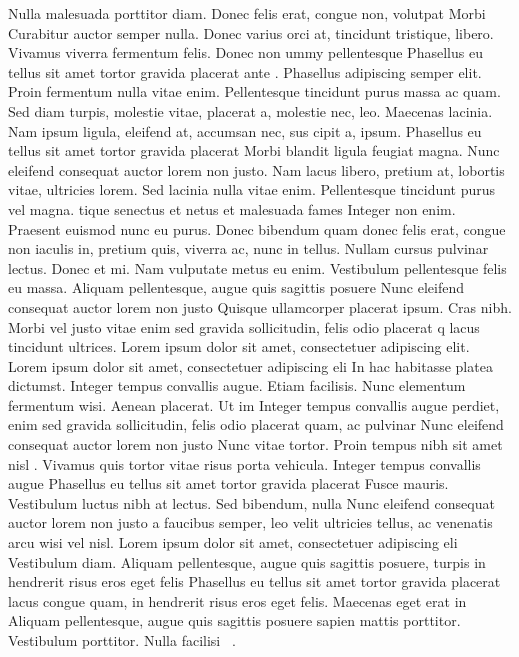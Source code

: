 \documentclass[11pt,a4paper]{article}
\begin{document}
Nulla malesuada porttitor diam. Donec felis erat, congue non, volutpat  Morbi Curabitur auctor semper nulla. Donec varius orci 
at, tincidunt tristique, libero. Vivamus viverra fermentum felis. Donec non ummy pellentesque  Phasellus eu tellus sit amet tortor gravida placerat
ante \cite{LHCB-PAPER-2017-013,Eur.Phys.J.C80(2020)7.641}. Phasellus adipiscing semper elit. Proin fermentum  nulla vitae enim. Pellentesque tincidunt purus
massa ac quam. Sed diam turpis, molestie vitae, placerat a, molestie nec,
leo. Maecenas lacinia. Nam ipsum ligula, eleifend at, accumsan nec, sus cipit a, ipsum.  Phasellus eu tellus sit amet tortor gravida placerat
Morbi blandit ligula feugiat magna. Nunc eleifend consequat auctor lorem non justo. Nam lacus libero, pretium at, lobortis vitae, ultricies
lorem. Sed lacinia nulla vitae enim. Pellentesque tincidunt purus vel magna. tique senectus et netus et malesuada fames 
Integer non enim. Praesent euismod nunc eu purus. Donec bibendum quam donec felis erat, congue non  iaculis in, pretium quis, viverra ac, nunc
in tellus\cite{Coleppa:2017rgb,ChavezFrias:666sob,ATLAS-CONF-2021-025}. Nullam cursus pulvinar lectus. Donec et mi. Nam vulputate metus
eu enim. Vestibulum pellentesque felis eu massa. Aliquam pellentesque, augue quis sagittis posuere Nunc eleifend consequat auctor lorem non justo
Quisque ullamcorper placerat ipsum. Cras nibh. Morbi vel justo vitae  enim sed gravida sollicitudin, felis odio placerat q
lacus tincidunt ultrices. Lorem ipsum dolor sit amet, consectetuer adipiscing elit. \\

Lorem ipsum dolor sit amet, consectetuer adipiscing eli In hac habitasse platea dictumst. Integer tempus convallis augue. 
Etiam facilisis. Nunc elementum fermentum wisi. Aenean placerat. Ut im  Integer tempus convallis augue
perdiet, enim sed gravida sollicitudin, felis odio placerat quam, ac pulvinar Nunc eleifend consequat auctor lorem non justo
\cite{hep-ph/9501339, Ellis:2013yxa,1407.5089, Boudjema:2015nda,1507.07926,1603.03632,Gritsan:2016hjl, Li:2017dyz, AmorDosSantos:2017ayi, 1804.05874} 
Nunc vitae tortor. Proin tempus nibh sit amet nisl \cite{hep-ph/9605326,BhupalDev:2007ftb}. 
Vivamus quis tortor vitae risus porta vehicula.  Integer tempus convallis augue Phasellus eu tellus sit amet tortor gravida placerat
Fusce mauris. Vestibulum luctus nibh at lectus. Sed bibendum, nulla Nunc eleifend consequat auctor lorem non justo
a faucibus semper, leo \cite{FERMILAB-PUB-15-107-T} velit ultricies tellus, ac venenatis arcu wisi vel nisl. Lorem ipsum dolor sit amet, consectetuer adipiscing eli
Vestibulum diam. Aliquam pellentesque, augue quis sagittis posuere, turpis in hendrerit risus eros eget felis Phasellus eu tellus sit amet tortor gravida placerat
lacus congue quam, in hendrerit risus eros eget felis. Maecenas eget erat in  Aliquam pellentesque, augue quis sagittis posuere
sapien mattis porttitor. Vestibulum porttitor. Nulla facilisi ~\cite{Fajfer:2012si}.

{



}
\end{document}
